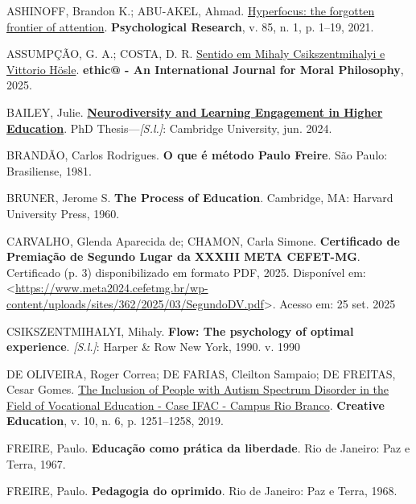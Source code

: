 \documentclass[
  12pt,
  a4paper,
]{article}
\newlength{\cslhangindent}
\newenvironment{CSLReferences}[2] %
 {\begin{list}{}{%
  \setlength{\itemindent}{0pt}
  \setlength{\leftmargin}{0pt}
  \setlength{\parsep}{0pt}
  \ifodd #1
   \setlength{\leftmargin}{\cslhangindent}
   \setlength{\itemindent}{-1\cslhangindent}
  \fi
  \setlength{\itemsep}{#2\baselineskip}}}
 {\end{list}}
\begin{document}
\label{refs}
\begin{CSLReferences}{0}{1}
ASHINOFF, Brandon K.; ABU-AKEL, Ahmad.
\href{https://doi.org/10.1007/s00426-019-01245-8}{Hyperfocus: the
forgotten frontier of attention}. \textbf{Psychological Research}, v.
85, n. 1, p. 1--19, 2021.

ASSUMPÇÃO, G. A.; COSTA, D. R.
\href{https://periodicos.ufsc.br/index.php/ethic/article/view/100953}{Sentido
em Mihaly Csikszentmihalyi e Vittorio Hösle}. \textbf{ethic@ - An
International Journal for Moral Philosophy}, 2025.

BAILEY, Julie.
\textbf{\href{https://www.repository.cam.ac.uk/handle/1810/375102}{Neurodiversity
and Learning Engagement in Higher Education}}. PhD
Thesis---\emph{{[}S.l.{]}}: Cambridge University, jun. 2024.

BRANDÃO, Carlos Rodrigues. \textbf{O que é método Paulo Freire}. São
Paulo: Brasiliense, 1981.

BRUNER, Jerome S. \textbf{The Process of Education}. Cambridge, MA:
Harvard University Press, 1960.

CARVALHO, Glenda Aparecida de; CHAMON, Carla Simone. \textbf{Certificado
de Premiação de Segundo Lugar da XXXIII META CEFET-MG}. Certificado (p.
3) disponibilizado em formato PDF, 2025. Disponível em:
\textless{}\url{https://www.meta2024.cefetmg.br/wp-content/uploads/sites/362/2025/03/SegundoDV.pdf}\textgreater.
Acesso em: 25 set. 2025

CSIKSZENTMIHALYI, Mihaly. \textbf{Flow: {The} psychology of optimal
experience}. \emph{{[}S.l.{]}}: Harper \& Row New York, 1990. v. 1990

DE OLIVEIRA, Roger Correa; DE FARIAS, Cleilton Sampaio; DE FREITAS,
Cesar Gomes. \href{https://doi.org/10.4236/ce.2019.106094}{The Inclusion
of People with Autism Spectrum Disorder in the Field of Vocational
Education - Case IFAC - Campus Rio Branco}. \textbf{Creative Education},
v. 10, n. 6, p. 1251--1258, 2019.

FREIRE, Paulo. \textbf{Educação como prática da liberdade}. Rio de
Janeiro: Paz e Terra, 1967.

FREIRE, Paulo. \textbf{Pedagogia do oprimido}. Rio de Janeiro: Paz e
Terra, 1968.


\end{CSLReferences}
\end{document}
